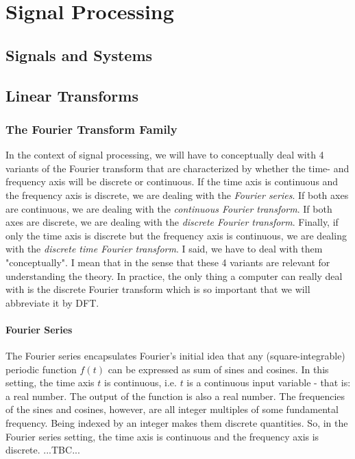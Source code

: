 \chapter{Signal Processing}

\section{Signals and Systems}



\section{Linear Transforms}

\subsection{The Fourier Transform Family}
In the context of signal processing, we will have to conceptually deal with 4 variants of the Fourier transform that are characterized by whether the time- and frequency axis will be discrete or continuous. If the time axis is continuous and the frequency axis is discrete, we are dealing with the \emph{Fourier series}. If both axes are continuous, we are dealing with the \emph{continuous Fourier transform}. If both axes are discrete, we are dealing with the \emph{discrete Fourier transform}. Finally, if only the time axis is discrete but the frequency axis is continuous, we are dealing with the \emph{discrete time Fourier transform}. I said, we have to deal with them "conceptually". I mean that in the sense that these 4 variants are relevant for understanding the theory. In practice, the only thing a computer can really deal with is the discrete Fourier transform which is so important that we will abbreviate it by DFT.

\subsubsection{Fourier Series}
The Fourier series encapsulates Fourier's initial idea that any (square-integrable) periodic function $f(t)$ can be expressed as sum of sines and cosines. In this setting, the time axis $t$ is continuous, i.e. $t$ is a continuous input variable - that is: a real number. The output of the function is also a real number. The frequencies of the sines and cosines, however, are all integer multiples of some fundamental frequency. Being indexed by an integer makes them discrete quantities. So, in the Fourier series setting, the time axis is continuous and the frequency axis is discrete. ...TBC...

